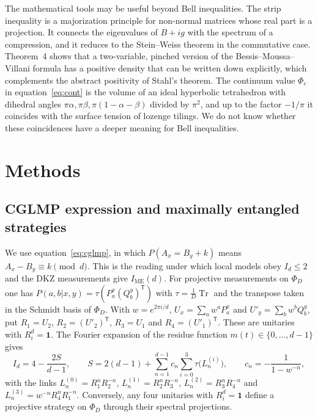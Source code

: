 \documentclass[11pt]{article}
\newcommand{\Tr}{\operatorname{Tr}}
\newcommand{\one}{\mathbf{1}}
\newcommand{\IME}{I_{\mathrm{ME}}}
\begin{document}
The mathematical tools may be useful beyond Bell inequalities. The strip inequality is a majorization principle for
non-normal matrices whose real part is a projection. It connects the eigenvalues of $B+ig$ with the spectrum of a
compression, and it reduces to the Stein--Weiss theorem in the commutative case. Theorem~4 shows that a two-variable,
pinched version of the Bessis--Moussa--Villani formula has a positive density that can be written down explicitly,
which complements the abstract positivity of Stahl's theorem\cite{Stahl2013,Heinavaara2023}. The continuum value
$\Phi_c$ in equation~\eqref{eq:cont} is the volume of an ideal hyperbolic tetrahedron with dihedral angles
$\pi\alpha,\pi\beta,\pi(1-\alpha-\beta)$ divided by $\pi^2$\cite{Milnor1982}, and up to the factor $-1/\pi$ it coincides
with the surface tension of lozenge tilings\cite{KOS2006}. We do not know whether these coincidences have a deeper meaning for Bell
inequalities.

\section*{Methods}

\subsection*{CGLMP expression and maximally entangled strategies}
We use equation~\eqref{eq:cglmp}, in which $P(A_x=B_y+k)$ means $A_x-B_y\equiv k\pmod d$. This is the reading under
which local models obey $I_d\le2$ and the DKZ measurements give $\IME(d)$\cite{CGLMP2002}. For projective measurements
on $\Phi_D$ one has $P(a,b|x,y)=\tau(P^x_a(Q^y_b)^{\mathsf T})$ with $\tau=\frac1D\Tr$ and the transpose taken in the
Schmidt basis of $\Phi_D$. With $w=e^{2\pi i/d}$, $U_x=\sum_aw^aP^x_a$ and $U'_y=\sum_bw^bQ^y_b$, put $R_1=U_2$,
$R_2=(U'_2)^{\mathsf T}$, $R_3=U_1$ and $R_4=(U'_1)^{\mathsf T}$. These are unitaries with $R_i^d=\one$. The
Fourier expansion of the residue function $m(t)\in\{0,\dots,d-1\}$ gives
\begin{equation}\label{eq:Strace}
I_d=4-\frac{2S}{d-1},\qquad S=2(d-1)+\sum_{n=1}^{d-1}c_n\sum_{i=0}^{3}\tau\bigl(L^{(i)}_n\bigr),\qquad
c_n=-\frac{1}{1-w^{-n}},
\end{equation}
with the links $L^{(0)}_n=R_1^nR_2^{-n}$, $L^{(1)}_n=R_2^nR_3^{-n}$, $L^{(2)}_n=R_3^nR_4^{-n}$ and
$L^{(3)}_n=w^{-n}R_4^nR_1^{-n}$. Conversely, any four unitaries with $R_i^d=\one$ define a projective strategy on
$\Phi_D$ through their spectral projections\cite{classical2026}.
\end{document}
